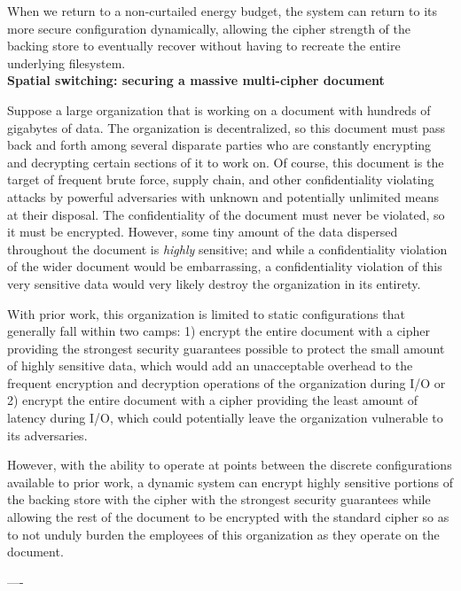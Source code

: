 When we return to a non-curtailed energy budget, the system can return to its
more secure configuration dynamically, allowing the cipher strength of the
backing store to eventually recover without having to recreate the entire
underlying filesystem.\\

\noindent
\textbf{Spatial switching: securing a massive multi-cipher document}


Suppose a large organization that is working on a document with hundreds of
gigabytes of data. The organization is decentralized, so this document must pass
back and forth among several disparate parties who are constantly encrypting and
decrypting certain sections of it to work on. Of course, this document is the
target of frequent brute force, supply chain, and other confidentiality
violating attacks by powerful adversaries with unknown and potentially unlimited
means at their disposal. The confidentiality of the document must never be
violated, so it must be encrypted. However, some tiny amount of the data
dispersed throughout the document is \emph{highly} sensitive; and while a
confidentiality violation of the wider document would be embarrassing, a
confidentiality violation of this very sensitive data would very likely destroy
the organization in its entirety.

With prior work, this organization is limited to static configurations that
generally fall within two camps: 1) encrypt the entire document with a cipher
providing the strongest security guarantees possible to protect the small amount
of highly sensitive data, which would add an unacceptable overhead to the
frequent encryption and decryption operations of the organization during I/O or
2) encrypt the entire document with a cipher providing the least amount of
latency during I/O, which could potentially leave the organization vulnerable to
its adversaries.

However, with the ability to operate at points between the discrete
configurations available to prior work, a dynamic system can encrypt highly
sensitive portions of the backing store with the cipher with the strongest
security guarantees while allowing the rest of the document to be encrypted with
the standard cipher so as to not unduly burden the employees of this
organization as they operate on the document.

----

